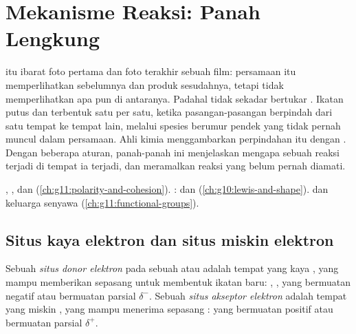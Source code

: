 \chapter{Mekanisme Reaksi: Panah Lengkung}\label{ch:g12:curly-arrows}

 itu ibarat foto pertama dan foto terakhir sebuah film:
persamaan itu memperlihatkan  sebelumnya dan produk sesudahnya,
tetapi tidak memperlihatkan apa pun di antaranya. Padahal  tidak
sekadar bertukar . Ikatan putus dan terbentuk satu per satu, ketika
pasangan-pasangan  berpindah dari satu tempat ke tempat lain,
melalui spesies berumur pendek yang tidak pernah muncul dalam
persamaan. Ahli kimia menggambarkan perpindahan itu dengan . Dengan beberapa aturan, panah-panah ini menjelaskan mengapa
sebuah reaksi terjadi di tempat ia terjadi, dan meramalkan reaksi yang
belum pernah diamati.

\begin{recall}
, , dan 
(\cref{ch:g11:polarity-and-cohesion}). :  dan 
(\cref{ch:g10:lewis-and-shape}).  dan keluarga senyawa
(\cref{ch:g11:functional-groups}).
\end{recall}

\section{Situs kaya elektron dan situs miskin elektron}

\begin{definition}\label{def:g12:curly-arrows:site}
Sebuah \emph{situs donor elektron} pada
sebuah  atau  adalah tempat yang kaya , yang mampu
memberikan sepasang  untuk membentuk ikatan baru: , ,  yang bermuatan negatif atau
bermuatan parsial $\delta^-$. Sebuah
\emph{situs akseptor elektron} adalah
tempat yang miskin , yang mampu menerima sepasang : 
yang bermuatan positif atau bermuatan parsial $\delta^+$.
\end{definition}

